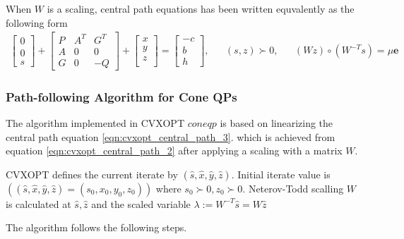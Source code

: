 When $W$ is a scaling, central path equations has been written equvalently as the following form
\begin{equation}
	\begin{aligned}
		\begin{bmatrix}
			0\\
			0\\
			s
		\end{bmatrix}
		+
		\begin{bmatrix}
			P & A^T & G^T\\
			A & 0 & 0\\
			G & 0 & -Q
		\end{bmatrix}
		+\begin{bmatrix}
			x\\
			y\\
			z\\
		\end{bmatrix}
		=
		\begin{bmatrix}
			-c\\
			b\\
			h
		\end{bmatrix}
		,
		& & (s,z)\succ 0, & & (Wz)\circ (W^{-T}s) = \mu \textbf{e}
	\end{aligned}
	\label{eqn:cvxopt_central_path_3}
\end{equation}

\subsubsection*{Path-following Algorithm for Cone QPs}

The algorithm implemented in CVXOPT $coneqp$ is based on linearizing the central path equation \ref{eqn:cvxopt_central_path_3}. which is achieved from equation \ref{eqn:cvxopt_central_path_2} after applying a scaling with a matrix $W$.

CVXOPT defines the current iterate by $(\hat{s},\hat{x},\hat{y},\hat{z})$. Initial iterate value is $((\hat{s},\hat{x},\hat{y},\hat{z})=(s_0,x_0,y_0,z_0))$ where $s_0\succ 0,z_0 \succ 0$. Neterov-Todd scalling $W$ is calculated at $\hat{s},\hat{z}$ and the scaled variable $\lambda := W^{-T}\hat{s} = W\hat{z}$

The algorithm follows the following steps.

